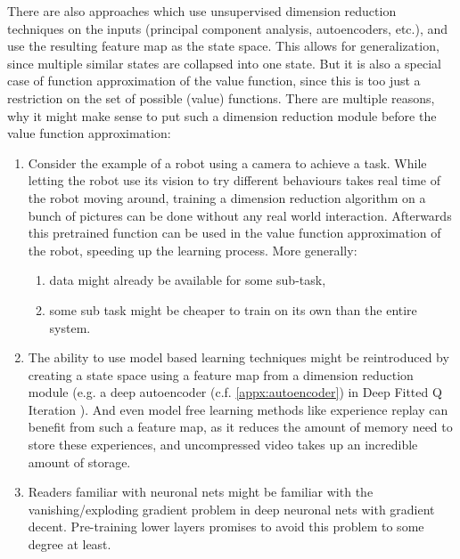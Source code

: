 There are also approaches which use unsupervised dimension reduction techniques on the inputs (principal component analysis, autoencoders, etc.), and use the resulting feature map as the state space. This allows for generalization, since multiple similar states are collapsed into one state. But it is also a special case of function approximation of the value function, since this is too just a restriction on the set of possible (value) functions. There are multiple reasons, why it might make sense to put such a dimension reduction module before the value function approximation:
\begin{enumerate}
	\item Consider the example of a robot using a camera to achieve a task. While letting the robot use its vision to try different behaviours takes real time of the robot moving around, training a dimension reduction algorithm on a bunch of pictures can be done without any real world interaction. Afterwards this pretrained function can be used in the value function approximation of the robot, speeding up the learning process. More generally:
	\begin{enumerate}
		\item data might already be available for some sub-task,
		\item some sub task might be cheaper to train on its own than the entire system.
	\end{enumerate}
	\item The ability to use model based learning techniques might be reintroduced by creating a state space using a feature map from a dimension reduction module (e.g. a deep autoencoder (c.f. \ref{appx:autoencoder}) in Deep Fitted Q Iteration \cite{langeBatchReinforcementLearning2012}). And even model free learning methods like experience replay can benefit from such a feature map, as it reduces the amount of memory need to store these experiences, and uncompressed video takes up an incredible amount of storage.
	\item Readers familiar with neuronal nets might be familiar with the vanishing/exploding gradient problem in deep neuronal nets with gradient decent. Pre-training lower layers promises to avoid this problem to some degree at least. 
\end{enumerate}

